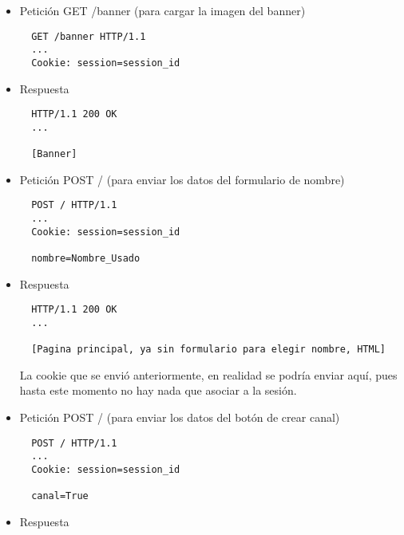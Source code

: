 {\begin{itemize}
\begin{verbatim}
  [Pagina principal, HTML]
\end{verbatim}

session\_id es un identificador de sesión (o de visitante), que se puede enviar también más adelante. Como identificador de sesión que es, será normalmente una cadena de caracteres larga, generada aleatoriamente, y por tanto difícil de adivinar para quien no la conozca.

\item Petición GET /banner (para cargar la imagen del banner)

\begin{verbatim}
  GET /banner HTTP/1.1
  ...
  Cookie: session=session_id
\end{verbatim}

\item Respuesta

\begin{verbatim}
  HTTP/1.1 200 OK
  ...

  [Banner]
\end{verbatim}

\item Petición POST / (para enviar los datos del formulario de nombre)

\begin{verbatim}
  POST / HTTP/1.1
  ...
  Cookie: session=session_id

  nombre=Nombre_Usado
\end{verbatim}

\item Respuesta

\begin{verbatim}
  HTTP/1.1 200 OK
  ...

  [Pagina principal, ya sin formulario para elegir nombre, HTML]
\end{verbatim}

La cookie que se envió anteriormente, en realidad se podría enviar aquí, pues hasta este momento no hay nada que asociar a la sesión.

\item Petición POST / (para enviar los datos del botón de crear canal)

\begin{verbatim}
  POST / HTTP/1.1
  ...
  Cookie: session=session_id

  canal=True
\end{verbatim}

\item Respuesta


\end{itemize}}
